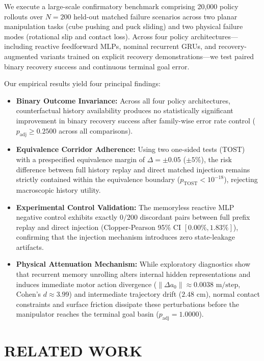 \documentclass[letterpaper, 10 pt, conference]{ieeeconf}
\begin{document}
We execute a large-scale confirmatory benchmark comprising 20,000 policy rollouts over $N=200$ held-out matched failure scenarios across two planar manipulation tasks (cube pushing and puck sliding) and two physical failure modes (rotational slip and contact loss). Across four policy architectures---including reactive feedforward MLPs, nominal recurrent GRUs, and recovery-augmented variants trained on explicit recovery demonstrations---we test paired binary recovery success and continuous terminal goal error. 

Our empirical results yield four principal findings:
\begin{itemize}
    \item \textbf{Binary Outcome Invariance:} Across all four policy architectures, counterfactual history availability produces no statistically significant improvement in binary recovery success after family-wise error rate control ($p_{\text{adj}} \ge 0.2500$ across all comparisons).
    \item \textbf{Equivalence Corridor Adherence:} Using two one-sided tests (TOST) with a prespecified equivalence margin of $\Delta = \pm 0.05$ ($\pm 5\%$), the risk difference between full history replay and direct matched injection remains strictly contained within the equivalence boundary ($p_{\text{TOST}} < 10^{-18}$), rejecting macroscopic history utility.
    \item \textbf{Experimental Control Validation:} The memoryless reactive MLP negative control exhibits exactly $0/200$ discordant pairs between full prefix replay and direct injection (Clopper-Pearson 95\% CI $[0.00\%, 1.83\%]$), confirming that the injection mechanism introduces zero state-leakage artifacts.
    \item \textbf{Physical Attenuation Mechanism:} While exploratory diagnostics show that recurrent memory unrolling alters internal hidden representations and induces immediate motor action divergence ($\|\Delta a_0\| \approx 0.0038\text{ m/step}$, Cohen's $d \approx 3.99$) and intermediate trajectory drift ($2.48\text{ cm}$), normal contact constraints and surface friction dissipate these perturbations before the manipulator reaches the terminal goal basin ($p_{\text{adj}} = 1.0000$).
\end{itemize}

\section{RELATED WORK}
\label{sec:related_work}
\end{document}
